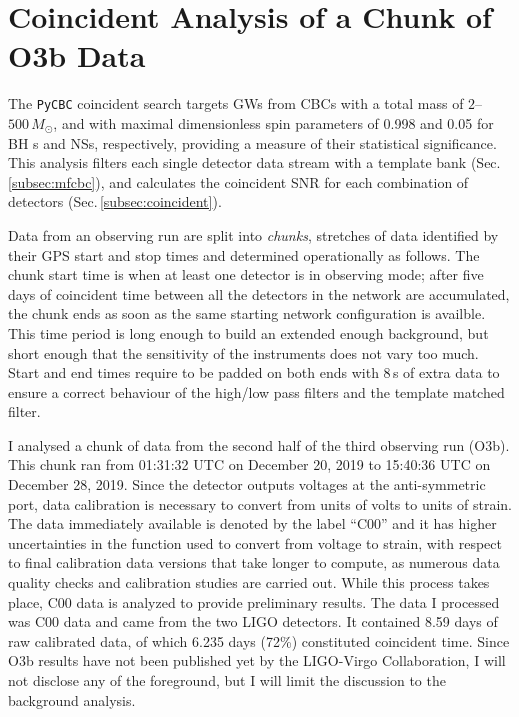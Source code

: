 \documentclass[binding=0.6cm, LaM]{sapthesis}
\begin{document}
\section{Coincident Analysis of a Chunk of O3b Data}
\label{sec:pycbc00}
	The {\texttt{PyCBC}} coincident search targets GWs from CBCs with a total mass of $2$--$500\,M_\odot$,
        and with maximal dimensionless spin parameters of 0.998 and 0.05 for BH s and NSs, respectively,
        providing a measure of their statistical significance.
        This analysis filters each single detector data stream with a template bank (Sec.\,\ref{subsec:mfcbc}),
        and calculates the coincident SNR for each combination of detectors (Sec.\,\ref{subsec:coincident}).

	Data from an observing run are split into \emph{chunks},
	stretches of data identified by their GPS start and stop times and
	determined operationally as follows.
	The chunk start time is when at least one detector is in observing mode;
	after five days of coincident time between all the detectors in the network are accumulated,
	the chunk ends as soon as the same starting network configuration is availble.
        This time period is long enough to build an extended enough background, 
	but short enough that the sensitivity of the instruments does not vary too much. 
	Start and end times require to be padded on both ends with 8\,s of extra data 	
	to ensure a correct behaviour of the high/low pass filters and the template matched filter.

        I analysed a chunk of data from the second half of the third observing run (O3b).  
	This chunk ran from 01:31:32 UTC on December 20, 2019 to 15:40:36 UTC on December 28, 2019.
	Since the detector outputs voltages at the anti-symmetric port, 
	data calibration is necessary to convert from units of volts to units of strain.
	The data immediately available is denoted by the label ``C00''  
	and it has higher uncertainties in the function used to convert from voltage to strain, 
	with respect to final calibration data versions that take longer to compute, as
        numerous data quality checks and calibration studies are carried out.
        While this process takes place, C00 data is analyzed to provide preliminary results.
	The data I processed was C00 data and came from the two LIGO detectors.
	It contained 8.59 days of raw calibrated data,
        of which 6.235 days (72\%) constituted coincident time.
        Since O3b results have not been published yet by the LIGO-Virgo Collaboration, 
	I will not disclose any of the foreground, but I will limit the discussion to the background analysis.
\end{document}
